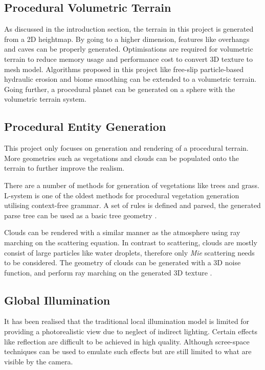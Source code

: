 \documentclass[oneside, a4paper]{report}
\begin{document}
    \subsection{Procedural Volumetric Terrain}

    As discussed in the introduction section, the terrain in this project is generated from a 2D heightmap. By going to a higher dimension, features like overhangs and caves can be properly generated. Optimisations are required for volumetric terrain to reduce memory usage and performance cost to convert 3D texture to mesh model. Algorithms proposed in this project like free-slip particle-based hydraulic erosion and biome smoothing can be extended to a volumetric terrain. Going further, a procedural planet can be generated on a sphere with the volumetric terrain system.

    \subsection{Procedural Entity Generation}

    This project only focuses on generation and rendering of a procedural terrain. More geometries such as vegetations and clouds can be populated onto the terrain to further improve the realism.

    There are a number of methods for generation of vegetations like trees and grass. L-system is one of the oldest methods for procedural vegetation generation utilising context-free grammar. A set of rules is defined and parsed, the generated parse tree can be used as a basic tree geometry \cite{l_system}.

    Clouds can be rendered with a similar manner as the atmosphere using ray marching on the scattering equation. In contrast to scattering, clouds are mostly consist of large particles like water droplets, therefore only \textit{Mie} scattering needs to be considered. The geometry of clouds can be generated with a 3D noise function, and perform ray marching on the generated 3D texture \cite{render_cloud}.

    \subsection{Global Illumination}

    It has been realised that the traditional local illumination model is limited for providing a photorealistic view due to neglect of indirect lighting. Certain effects like reflection are difficult to be achieved in high quality. Although scree-space techniques can be used to emulate such effects but are still limited to what are visible by the camera.
\end{document}
